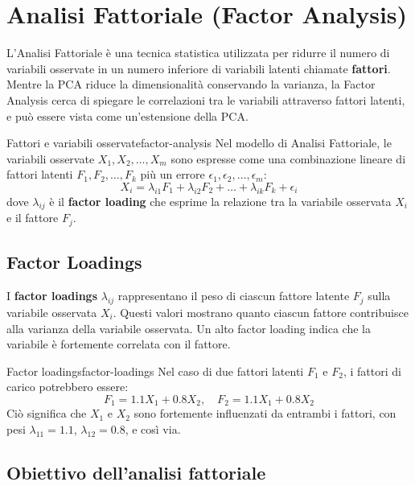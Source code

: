 \section{Analisi Fattoriale (Factor Analysis)}\label{sec:factor-analysis}

L'Analisi Fattoriale è una tecnica statistica utilizzata per ridurre il numero
di variabili osservate in un numero inferiore di variabili latenti chiamate
\textbf{fattori}. Mentre la PCA riduce la dimensionalità conservando la
varianza, la Factor Analysis cerca di spiegare le correlazioni tra le variabili
attraverso fattori latenti, e può essere vista come un'estensione della PCA.

\begin{definizione}{Fattori e variabili osservate}{factor-analysis}
Nel modello di Analisi Fattoriale, le variabili osservate \( X_1, X_2, \dots,
X_m \) sono espresse come una combinazione lineare di fattori latenti \( F_1,
F_2, \dots, F_k \) più un errore \( \epsilon_1, \epsilon_2, \dots, \epsilon_m
\):
\[
X_i = \lambda_{i1} F_1 + \lambda_{i2} F_2 + \dots + \lambda_{ik} F_k +
\epsilon_i
\]
dove \( \lambda_{ij} \) è il \textbf{factor loading} che esprime la relazione
tra la variabile osservata \( X_i \) e il fattore \( F_j \).
\end{definizione}

\subsection{Factor Loadings}

I \textbf{factor loadings} \( \lambda_{ij} \) rappresentano il peso di ciascun
fattore latente \( F_j \) sulla variabile osservata \( X_i \). Questi valori
mostrano quanto ciascun fattore contribuisce alla varianza della variabile
osservata. Un alto factor loading indica che la variabile è fortemente
correlata con il fattore.

\begin{esempio}{Factor loadings}{factor-loadings}
Nel caso di due fattori latenti \( F_1 \) e \( F_2 \), i fattori di carico
potrebbero essere:
\[
F_1 = 1.1 X_1 + 0.8 X_2, \quad F_2 = 1.1 X_1 + 0.8 X_2
\]
Ciò significa che \( X_1 \) e \( X_2 \) sono fortemente influenzati da entrambi
i fattori, con pesi \( \lambda_{11} = 1.1 \), \( \lambda_{12} = 0.8 \), e così
via.
\end{esempio}

\subsection{Obiettivo dell'analisi fattoriale}

